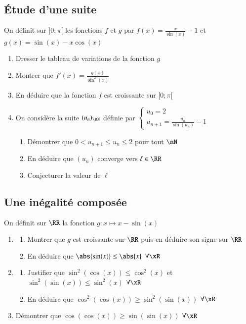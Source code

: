 \documentclass[oneside,12pt]{article}          %
\begin{document}
\subsection{Étude d'une suite}
On définit sur $]0;\pi[$ les fonctions $f$ et $g$ par $f(x)=\frac{x}{\sin(x)}-1$ et $g(x)=\sin(x)-x\cos(x)$
\begin{enumerate}
	\item Dresser le tableau de variations de la fonction $g$
	\item Montrer que $f'(x)=\frac{g(x)}{\sin^2(x)}$
	\item En déduire que la fonction $f$ est croissante sur $[0;\pi[$
	\item On considère la suite $(u_n)_{\nN}$ définie par $\begin{cases}u_0=2\\u_{n+1}=\frac{u_n}{\sin\left(u_n\right)}-1\end{cases}$
	\begin{enumerate}
		\item Démontrer que $0< u_{n+1}\leq u_n\leq2$ pour tout $\nN$
		\item En déduire que $(u_n)$ converge vers $\ell\in\RR$
		\item Conjecturer la valeur de $\ell$
	\end{enumerate}
\end{enumerate}



\subsection{Une inégalité composée}
On définit sur $\RR$ la fonction $g:x\mapsto x-\sin(x)$
\begin{enumerate}
	\item \begin{enumerate}
		\item Montrer que $g$ est croissante sur $\RR$ puis en déduire son signe sur $\RR$
		\item En déduire que $\abs{\sin(x)}\leq\abs{x}$ \quad $\forall\xR$
	\end{enumerate}
	\item \begin{enumerate}
		\item Justifier que $\sin^2(\cos(x))\leq\cos^2(x)$ et $\sin^2(\sin(x))\leq\sin^2(x)$ \quad $\forall\xR$
		\item En déduire que $\cos^2(\cos(x)) \geq \sin^2(\sin(x))$ \quad $\forall\xR$
	\end{enumerate}
	\item Démontrer que $\cos(\cos(x)) \geq \sin(\sin(x))$ \quad $\forall\xR$
\end{enumerate}
\end{document}
